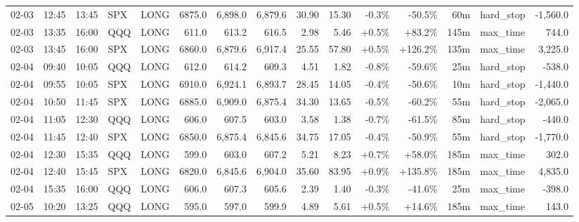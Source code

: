 \documentclass[11pt,a4paper,twoside]{article}
\begin{document}
\begin{landscape}
\begin{center}
\begin{longtable}{>{\color{txtmain}}l l l l l r r r r r r r r >{\color{txtmain}}l r}
02-03 & 12:45 & 13:45 & SPX & LONG & 6875.0 & 6,898.0 & 6,879.6 & 30.90 & 15.30 & \textcolor{lossred}{-0.3\%} & \textcolor{lossred}{-50.5\%} & 60m & hard\_stop & \textcolor{lossred}{-1,560.0} \\
02-03 & 13:35 & 16:00 & QQQ & LONG & 611.0 & 613.2 & 616.5 & 2.98 & 5.46 & \textcolor{wingreen}{+0.5\%} & \textcolor{wingreen}{+83.2\%} & 145m & max\_time & \textcolor{wingreen}{744.0} \\
02-03 & 13:45 & 16:00 & SPX & LONG & 6860.0 & 6,879.6 & 6,917.4 & 25.55 & 57.80 & \textcolor{wingreen}{+0.5\%} & \textcolor{wingreen}{+126.2\%} & 135m & max\_time & \textcolor{wingreen}{3,225.0} \\
02-04 & 09:40 & 10:05 & QQQ & LONG & 612.0 & 614.2 & 609.3 & 4.51 & 1.82 & \textcolor{lossred}{-0.8\%} & \textcolor{lossred}{-59.6\%} & 25m & hard\_stop & \textcolor{lossred}{-538.0} \\
02-04 & 09:55 & 10:05 & SPX & LONG & 6910.0 & 6,924.1 & 6,893.7 & 28.45 & 14.05 & \textcolor{lossred}{-0.4\%} & \textcolor{lossred}{-50.6\%} & 10m & hard\_stop & \textcolor{lossred}{-1,440.0} \\
02-04 & 10:50 & 11:45 & SPX & LONG & 6885.0 & 6,909.0 & 6,875.4 & 34.30 & 13.65 & \textcolor{lossred}{-0.5\%} & \textcolor{lossred}{-60.2\%} & 55m & hard\_stop & \textcolor{lossred}{-2,065.0} \\
02-04 & 11:05 & 12:30 & QQQ & LONG & 606.0 & 607.5 & 603.0 & 3.58 & 1.38 & \textcolor{lossred}{-0.7\%} & \textcolor{lossred}{-61.5\%} & 85m & hard\_stop & \textcolor{lossred}{-440.0} \\
02-04 & 11:45 & 12:40 & SPX & LONG & 6850.0 & 6,875.4 & 6,845.6 & 34.75 & 17.05 & \textcolor{lossred}{-0.4\%} & \textcolor{lossred}{-50.9\%} & 55m & hard\_stop & \textcolor{lossred}{-1,770.0} \\
02-04 & 12:30 & 15:35 & QQQ & LONG & 599.0 & 603.0 & 607.2 & 5.21 & 8.23 & \textcolor{wingreen}{+0.7\%} & \textcolor{wingreen}{+58.0\%} & 185m & max\_time & \textcolor{wingreen}{302.0} \\
02-04 & 12:40 & 15:45 & SPX & LONG & 6820.0 & 6,845.6 & 6,904.0 & 35.60 & 83.95 & \textcolor{wingreen}{+0.9\%} & \textcolor{wingreen}{+135.8\%} & 185m & max\_time & \textcolor{wingreen}{4,835.0} \\
02-04 & 15:35 & 16:00 & QQQ & LONG & 606.0 & 607.3 & 605.6 & 2.39 & 1.40 & \textcolor{lossred}{-0.3\%} & \textcolor{lossred}{-41.6\%} & 25m & max\_time & \textcolor{lossred}{-398.0} \\
02-05 & 10:20 & 13:25 & QQQ & LONG & 595.0 & 597.0 & 599.9 & 4.89 & 5.61 & \textcolor{wingreen}{+0.5\%} & \textcolor{wingreen}{+14.6\%} & 185m & max\_time & \textcolor{wingreen}{143.0} \\

\end{longtable}
\end{center}
\end{landscape}
\end{document}
